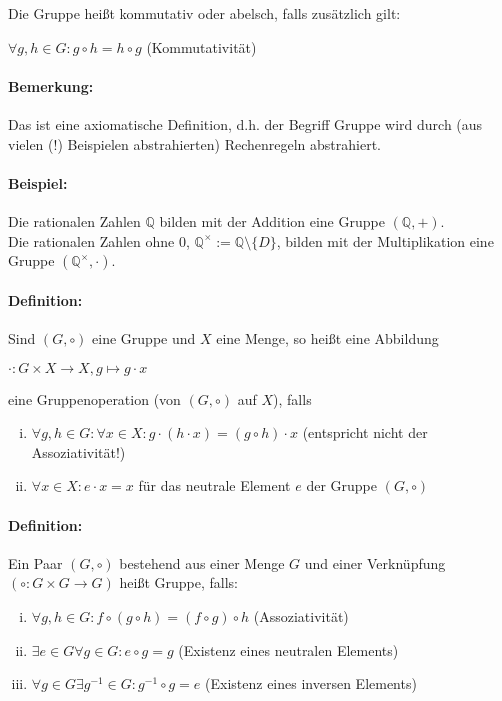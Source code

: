 \documentclass[12pt,a4paper,parskip=half-,DIV=15]{scrartcl}
\begin{document}
Die Gruppe heißt kommutativ oder abelsch, falls zusätzlich gilt:
\begin{center}$\forall g,h\in G: g\circ h = h\circ g$ (Kommutativität)\end{center}

\paragraph{Bemerkung:} Das ist eine axiomatische Definition, d.h. der Begriff \glqq Gruppe\grqq{} wird durch (aus vielen (!) Beispielen abstrahierten) \glqq Rechenregeln\grqq{} abstrahiert.
\paragraph{Beispiel:} Die rationalen Zahlen $\mathbb{Q}$ bilden mit der Addition eine Gruppe $(\mathbb{Q} ,+)$.\\
Die rationalen Zahlen ohne $0$, $\mathbb{Q}^{\times} := \mathbb{Q}\setminus \{D\}$, bilden mit der Multiplikation eine Gruppe $(\mathbb{Q}^\times ,\cdot)$.

\paragraph{Definition:} Sind $(G,\circ )$ eine Gruppe und $X$ eine Menge, so heißt eine Abbildung 
\begin{center}$\cdot : G\times X\to X, g\mapsto g\cdot x$\end{center}
eine Gruppenoperation (von $(G,\circ )$ auf $X$), falls
\begin{enumerate}[(i)]
\item $\forall g,h\in G :\forall x\in X: g\cdot (h\cdot x) = (g\circ h)\cdot x$ (entspricht nicht der Assoziativität!)
\item $\forall x\in X: e\cdot x = x$ für das neutrale Element $e$ der Gruppe $(G,\circ )$
\end{enumerate}

\paragraph{Definition:} Ein Paar $(G,\circ)$ bestehend aus einer Menge $G$ und einer Verknüpfung $(\circ : G\times G \to G)$ heißt Gruppe, falls:

\begin{enumerate}[(i)]
\item $\forall g,h\in G : f\circ (g\circ h) = (f\circ g)\circ h$ (Assoziativität)
\item $\exists e\in G\forall g\in G : e\circ g = g$ (Existenz eines neutralen Elements)
\item $\forall g \in G \exists g^{-1} \in G : g^{-1}\circ g = e$ (Existenz eines inversen Elements)
\end{enumerate}
\end{document}

